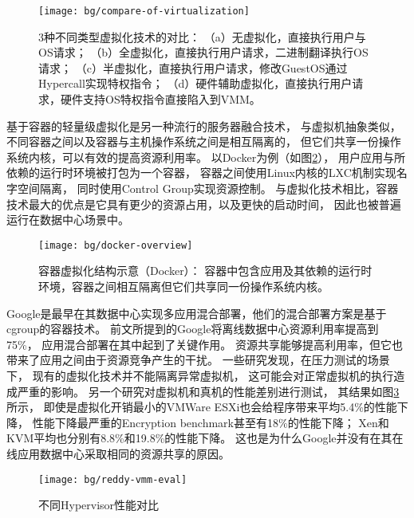 \begin{figure}[t]
  \centering
  \texttt{[image: bg/compare-of-virtualization]}
  \caption[3种不同类型虚拟化技术的对比]{3种不同类型虚拟化技术的对比：
    （a）无虚拟化，直接执行用户与OS请求；
    （b）全虚拟化，直接执行用户请求，二进制翻译执行OS请求；
    （c）半虚拟化，直接执行用户请求，修改GuestOS通过Hypercall实现特权指令；
    （d）硬件辅助虚拟化，直接执行用户请求，硬件支持OS特权指令直接陷入到VMM。}
  \label{fig:compare-of-virt}
\end{figure}

基于容器的轻量级虚拟化是另一种流行的服务器融合技术，
与虚拟机抽象类似，不同容器之间以及容器与主机操作系统之间是相互隔离的，
但它们共享一份操作系统内核，可以有效的提高资源利用率。
以Docker为例（如图\ref{fig:docker-overview}），
用户应用与所依赖的运行时环境被打包为一个容器，
容器之间使用Linux内核的LXC\cite{lxc}机制实现名字空间隔离，
同时使用Control Group\cite{cgroup}实现资源控制。
与虚拟化技术相比，容器技术最大的优点是它具有更少的资源占用，以及更快的启动时间，
因此也被普遍运行在数据中心场景中。

\begin{figure}[htb]
  \centering
  \begin{minipage}{0.75\textwidth}
    \texttt{[image: bg/docker-overview]}
    \caption[容器虚拟化结构示意（Docker）]{容器虚拟化结构示意（Docker）：
      容器中包含应用及其依赖的运行时环境，容器之间相互隔离但它们共享同一份操作系统内核。}
    \label{fig:docker-overview}
  \end{minipage}
\end{figure}


Google是最早在其数据中心实现多应用混合部署，他们的混合部署方案是基于cgroup的容器技术。
前文所提到的Google将离线数据中心资源利用率提高到75\%，
应用混合部署在其中起到了关键作用。
资源共享能够提高利用率，但它也带来了应用之间由于资源竞争产生的干扰。
一些研究发现，在压力测试的场景下，
现有的虚拟化技术并不能隔离异常虚拟机\cite{Matthews:2007}，
这可能会对正常虚拟机的执行造成严重的影响。
另一个研究\cite{Reddy:2014}对虚拟机和真机的性能差别进行测试，
其结果如图\ref{fig:reddy-vmm-eval}所示，
即使是虚拟化开销最小的VMWare ESXi也会给程序带来平均5.4\%的性能下降，
性能下降最严重的Encryption benchmark甚至有18\%的性能下降；
Xen和KVM平均也分别有8.8\%和19.8\%的性能下降。
这也是为什么Google并没有在其在线应用数据中心采取相同的资源共享的原因。

\begin{figure}[tb]
  \centering
  \texttt{[image: bg/reddy-vmm-eval]}
  \caption{不同Hypervisor性能对比\cite{Reddy:2014}}
  \label{fig:reddy-vmm-eval}
\end{figure}


